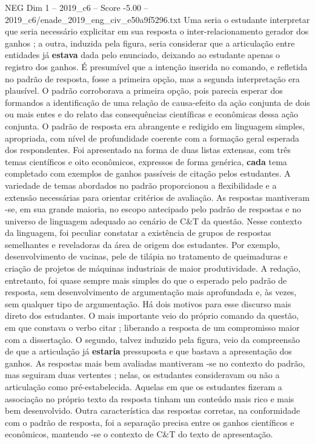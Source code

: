 \begin{textsample}{NEG Dim 1 – 2019\_c6 – Score -5.00 – 2019\_c6/enade\_2019\_eng\_civ\_e50a9f5296.txt}
Uma seria o estudante interpretar que seria necessário explicitar em sua resposta o inter-relacionamento gerador dos ganhos ; a outra, induzida pela figura, seria considerar que a articulação entre entidades já \textbf{estava} dada pelo enunciado, deixando ao estudante apenas o registro dos ganhos.
É presumível que a intenção inserida no comando, e refletida no padrão de resposta, fosse a primeira opção, mas a segunda interpretação era plausível.
O padrão corroborava a primeira opção, pois parecia esperar dos formandos a identificação de uma relação de causa-efeito da ação conjunta de dois ou mais entes e do relato das consequências científicas e econômicas dessa ação conjunta.
O padrão de resposta era abrangente e redigido em linguagem simples, apropriada, com nível de profundidade coerente com a formação geral esperada dos respondentes.
Foi apresentado na forma de duas listas extensas, com três temas científicos e oito econômicos, expressos de forma genérica, \textbf{cada} tema completado com exemplos de ganhos passíveis de citação pelos estudantes.
A variedade de temas abordados no padrão proporcionou a flexibilidade e a extensão necessárias para orientar critérios de avaliação.
As respostas mantiveram -se, em sua grande maioria, no escopo antecipado pelo padrão de respostas e no universo de linguagem adequado ao cenário de C\&T da questão.
Nesse contexto da linguagem, foi peculiar constatar a existência de grupos de respostas semelhantes e reveladoras da área de origem dos estudantes.
Por exemplo, desenvolvimento de vacinas, pele de tilápia no tratamento de queimaduras e criação de projetos de máquinas industriais de maior produtividade.
A redação, entretanto, foi quase sempre mais simples do que o esperado pelo padrão de resposta, sem desenvolvimento de argumentação mais aprofundada e, às vezes, sem qualquer tipo de argumentação.
Há dois motivos para esse discurso mais direto dos estudantes.
O mais importante veio do próprio comando da questão, em que constava o verbo citar ; liberando a resposta de um compromisso maior com a dissertação.
O segundo, talvez induzido pela figura, veio da compreensão de que a articulação já \textbf{estaria} pressuposta e que bastava a apresentação dos ganhos.
As respostas mais bem avaliadas mantiveram -se no contexto do padrão, mas seguiram duas vertentes ; nelas, os estudantes consideravam ou não a articulação como pré-estabelecida.
Aquelas em que os estudantes fizeram a associação no próprio texto da resposta tinham um conteúdo mais rico e mais bem desenvolvido.
Outra característica das respostas corretas, na conformidade com o padrão de resposta, foi a separação precisa entre os ganhos científicos e econômicos, mantendo -se o contexto de C\&T do texto de apresentação.

\end{textsample}
